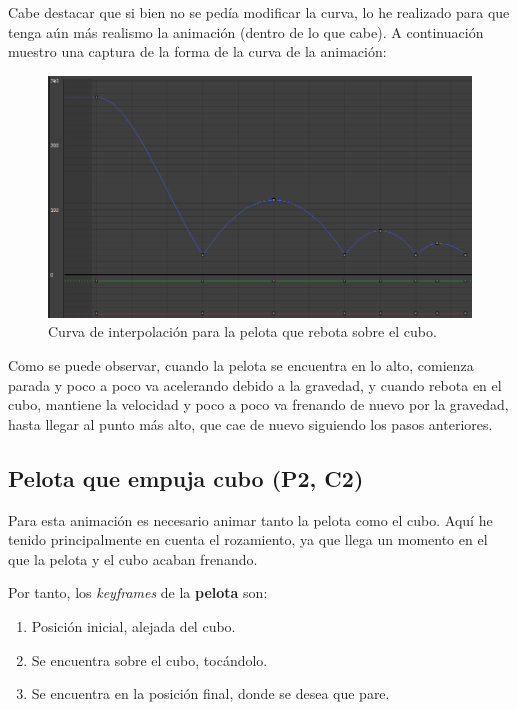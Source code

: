 \documentclass{article}
\begin{document}
Cabe destacar que si bien no se pedía modificar la curva, lo he realizado para que tenga aún más realismo la animación (dentro de lo que cabe). A continuación muestro una captura de la forma de la curva de la animación:


\begin{figure}[H]
    \centering
    \includegraphics[width=\textwidth]{imagenes/Ejercicio 1/curva_p1.png}
    \caption{Curva de interpolación para la pelota que rebota sobre el cubo.}
\end{figure}


Como se puede observar, cuando la pelota se encuentra en lo alto, comienza parada y poco a poco va acelerando debido a la gravedad, y cuando rebota en el cubo, mantiene la velocidad y poco a poco va frenando de nuevo por la gravedad, hasta llegar al punto más alto, que cae de nuevo siguiendo los pasos anteriores.

\subsection{Pelota que empuja cubo (P2, C2)}

Para esta animación es necesario animar tanto la pelota como el cubo. Aquí he tenido principalmente en cuenta el rozamiento, ya que llega un momento en el que la pelota y el cubo acaban frenando.

\bigskip

Por tanto, los \textit{keyframes} de la \textbf{pelota} son:

\begin{enumerate}
    \item Posición inicial, alejada del cubo.
    \item Se encuentra sobre el cubo, tocándolo.
    \item Se encuentra en la posición final, donde se desea que pare.
\end{enumerate}
\end{document}
